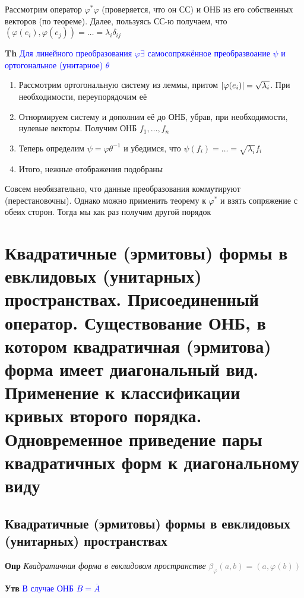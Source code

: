 \documentclass[a4paper, 14pt]{article}
\begin{document}
    Рассмотрим оператор $\varphi^* \varphi$ (проверяется, что он СС) и ОНБ из его собственных векторов (по теореме).
    Далее, пользуясь СС-ю получаем, что $(\varphi(e_i), \varphi(e_j)) = \dots = \lambda_i \delta_{ij}$
    
    \textbf{Th} \textcolor{blue}{Для линейного преобразования $\varphi \exists$ самосопряжённое
    преобразвоание $\psi$ и ортогональное (унитарное) $\theta$}
    
    \begin{enumerate}
        \item Рассмотрим ортогональную систему из леммы, притом $\abs{\varphi(e_i)} = \sqrt{\lambda_i}$.
        При необходимости, переупорядочим её
        \item Отнормируем систему и дополним её до ОНБ, убрав, при необходимости, нулевые векторы.
        Получим ОНБ $f_1, \dots, f_n$
        \item Теперь определим $\psi = \varphi \theta^{-1}$ и убедимся, что $\psi(f_i) = \dots = \sqrt{\lambda_i} f_i$
        \item Итого, нежные отображения подобраны
    \end{enumerate}
    
    Совсем необязательно, что данные преобразования коммутируют (перестановочны).
    Однако можно применить теорему к $\varphi^*$ и взять сопряжение с обеих сторон.
    Тогда мы как раз получим другой порядок
    
    \section{Квадратичные (эрмитовы) формы в евклидовых (унитарных) пространствах.
    Присоединенный оператор.
    Существование ОНБ, в котором квадратичная (эрмитова) форма имеет диагональный вид.
    Применение к классификации кривых второго порядка.
    Одновременное приведение пары квадратичных форм к диагональному виду}
    
    \subsection{Квадратичные (эрмитовы) формы в евклидовых (унитарных) пространствах}
    
    \textbf{Опр} \textit{Квадратичная форма в евклидовом пространстве} \textcolor{gray}{$\beta_\varphi (a, b) = (a, \varphi(b))$}
    
    \textbf{Утв} \textcolor{blue}{В случае ОНБ $B = \overline{A}$}
    
\end{document}
